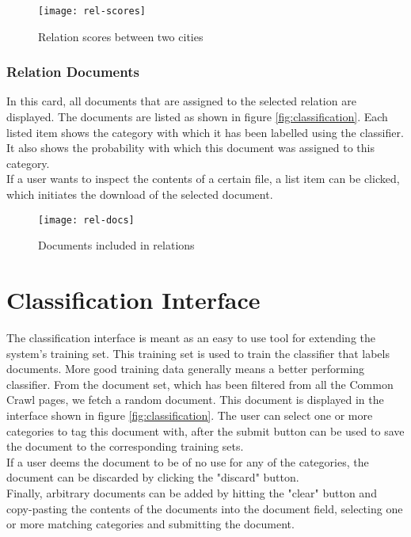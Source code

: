 \begin{figure}[H]
    \centering
    \texttt{[image: rel-scores]}
    \caption{Relation scores between two cities}
    \label{fig:rel-scores}
\end{figure}

\subsubsection{Relation Documents}\label{sec:rel-docs}

In this card, all documents that are assigned to the selected relation are displayed. The documents are listed as shown in figure \ref{fig:classification}. Each listed item shows the category with which it has been labelled using the classifier. It also shows the probability with which this document was assigned to this category.\\
If a user wants to inspect the contents of a certain file, a list item can be clicked, which initiates the download of the selected document.

\begin{figure}[H]
    \centering
    \texttt{[image: rel-docs]}
    \caption{Documents included in relations}
    \label{fig:rel-docs}
\end{figure}


\section{Classification Interface}

The classification interface is meant as an easy to use tool for extending the system's training set. This training set is used to train the classifier that labels documents. More good training data generally means a better performing classifier. From the document set, which has been filtered from all the Common Crawl pages, we fetch a random document. This document is displayed in the interface shown in figure \ref{fig:classification}. The user can select one or more categories to tag this document with, after the submit button can be used to save the document to the corresponding training sets.\\
If a user deems the document to be of no use for any of the categories, the document can be discarded by clicking the "discard" button.\\
Finally, arbitrary documents can be added by hitting the "clear" button and copy-pasting the contents of the documents into the document field, selecting one or more matching categories and submitting the document.

